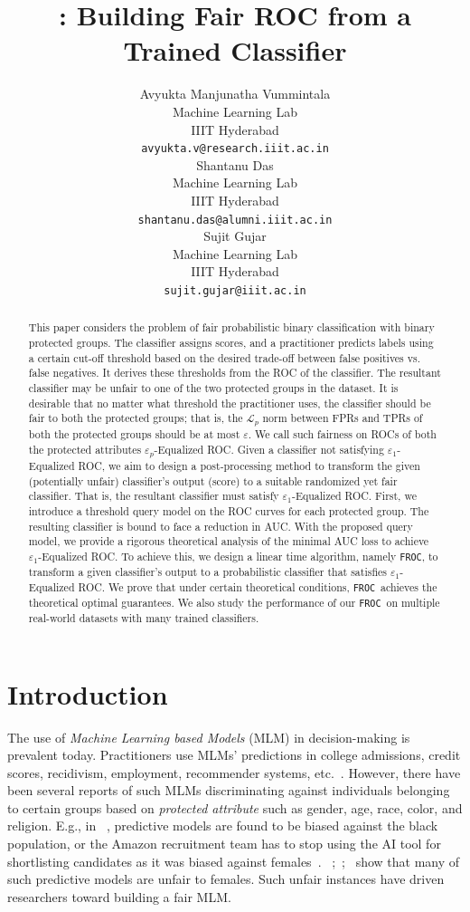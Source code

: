 \documentclass{article}
\title{\ouralgo: Building Fair ROC from a Trained Classifier}
\author{
Avyukta Manjunatha Vummintala \\
Machine Learning Lab\\
IIIT Hyderabad\\
\texttt{avyukta.v@research.iiit.ac.in} \\
\And
Shantanu Das \\
Machine Learning Lab\\
IIIT Hyderabad\\
\texttt{shantanu.das@alumni.iiit.ac.in} \\
\And
Sujit Gujar \\
Machine Learning Lab\\
IIIT Hyderabad\\
\texttt{sujit.gujar@iiit.ac.in} \\
}
\newcommand{\ouralgo}{\texttt{FROC}}
\newcommand{\ourdef}{-Equalized ROC}
\begin{document}
\maketitle



\begin{abstract}
This paper considers the problem of fair probabilistic binary classification with binary protected groups. The classifier assigns scores, and a practitioner predicts labels using a certain cut-off threshold based on the desired trade-off between false positives vs. false negatives. It derives these thresholds from the ROC of the classifier. The resultant classifier may be unfair to one of the two protected groups in the dataset. It is desirable that no matter what threshold the practitioner uses, the classifier should be fair to both the protected groups; that is, the $\mathcal{L}_p$ norm between FPRs and TPRs of both the protected groups should be at most $\varepsilon$. We call such fairness on ROCs of both the protected attributes $\varepsilon_p$\ourdef. Given a classifier not satisfying $\varepsilon_1$\ourdef, we aim to design a post-processing method to transform the given (potentially unfair) classifier's output (score) to a suitable randomized yet fair classifier. That is, the resultant classifier must satisfy $\varepsilon_1$\ourdef. First, we introduce a threshold query model on the ROC curves for each protected group. The resulting classifier is bound to face a reduction in AUC. With the proposed query model, we provide a rigorous theoretical analysis of the minimal AUC loss to achieve $\varepsilon_1$\ourdef. To achieve this, we design a linear time algorithm, namely \ouralgo, to transform a given classifier's output to a probabilistic classifier that satisfies $\varepsilon_1$\ourdef. We prove that under certain theoretical conditions, \ouralgo\ achieves the theoretical optimal guarantees. We also study the performance of our \ouralgo\ on multiple real-world datasets with many trained classifiers.
\end{abstract}
\section{Introduction}
\label{sec:intro}
The use of \emph{Machine Learning based Models} (MLM) in decision-making is prevalent today. Practitioners use MLMs' predictions in college admissions, credit scores, recidivism, employment, recommender systems, etc.~\cite {portugal18,berger05}. However, there have been several reports of such MLMs discriminating against individuals belonging to certain groups based on \emph{protected attribute} such as gender, age, race, color, and religion. E.g., in ~\cite{angwin16}, predictive models are found to be biased against the black population, or the Amazon recruitment team has to stop using the AI tool for shortlisting candidates as it was biased against females~\cite{dastin18}. ~\cite{bickel75};~\cite{berger05};~\cite{zhao18} show that many of such predictive models are unfair to females. Such unfair instances have driven researchers toward building a fair MLM. 
\end{document}
